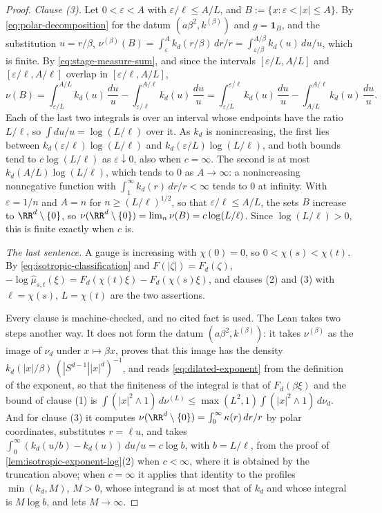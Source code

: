 \begin{proof}
\emph{Clause (3).} Let $0 < \varepsilon < A$ with $\varepsilon/\ell \le A/L$, and
$B := \{x : \varepsilon < |x| \le A\}$. By \ref{eq:polar-decomposition} for the datum
$(a\beta^2, k^{(\beta)})$ and $g = \mathbf 1_B$, and the substitution $u = r/\beta$,
$\nu^{(\beta)}(B) = \int_\varepsilon^A k_d(r/\beta)\,dr/r
= \int_{\varepsilon/\beta}^{A/\beta}k_d(u)\,du/u$, which is finite. By
\ref{eq:stage-measure-sum}, and since the intervals $[\varepsilon/L, A/L]$ and
$[\varepsilon/\ell, A/\ell]$ overlap in $[\varepsilon/\ell, A/L]$,
\[
  \nu(B) = \int_{\varepsilon/L}^{A/L}k_d(u)\,\frac{du}{u} - \int_{\varepsilon/\ell}^{A/\ell}k_d(u)\,\frac{du}{u}
         = \int_{\varepsilon/L}^{\varepsilon/\ell}k_d(u)\,\frac{du}{u}
           - \int_{A/L}^{A/\ell}k_d(u)\,\frac{du}{u} .
\]
Each of the last two integrals is over an interval whose endpoints have the ratio $L/\ell$, so
$\int du/u = \log(L/\ell)$ over it. As $k_d$ is nonincreasing, the first lies between
$k_d(\varepsilon/\ell)\log(L/\ell)$ and $k_d(\varepsilon/L)\log(L/\ell)$, and both bounds tend
to $c\log(L/\ell)$ as $\varepsilon \downarrow 0$, also when $c = \infty$. The second is at most
$k_d(A/L)\log(L/\ell)$, which tends to $0$ as $A \to \infty$: a nonincreasing nonnegative
function with $\int_1^\infty k_d(r)\,dr/r < \infty$ tends to $0$ at infinity. With
$\varepsilon = 1/n$ and $A = n$ for $n \ge (L/\ell)^{1/2}$, so that
$\varepsilon/\ell \le A/L$, the sets $B$ increase to $\RR^d \setminus \{0\}$, so
$\nu(\RR^d \setminus \{0\}) = \lim_n\nu(B) = c\log(L/\ell)$. Since $\log(L/\ell) > 0$, this is
finite exactly when $c$ is.

\emph{The last sentence.} A gauge is increasing with $\chi(0) = 0$, so
$0 < \chi(s) < \chi(t)$. By \ref{eq:isotropic-classification} and $F(|\zeta|) = F_d(\zeta)$,
$-\log\widehat\mu_{s,t}(\xi) = F_d(\chi(t)\xi) - F_d(\chi(s)\xi)$, and clauses (2) and (3) with
$\ell = \chi(s)$, $L = \chi(t)$ are the two assertions.

Every clause is machine-checked, and no cited fact is used. The Lean takes two steps another
way. It does not form the datum $(a\beta^2, k^{(\beta)})$: it takes $\nu^{(\beta)}$ as the image
of $\nu_d$ under $x \mapsto \beta x$, proves that this image has the density
$k_d(|x|/\beta)\,(|S^{d-1}||x|^d)^{-1}$, and reads \ref{eq:dilated-exponent} from the definition
of the exponent, so that the finiteness of the integral is that of $F_d(\beta\xi)$ and the bound
of clause (1) is
$\int(|x|^2 \wedge 1)\,d\nu^{(L)} \le \max(L^2,1)\int(|x|^2 \wedge 1)\,d\nu_d$. And for clause (3)
it computes $\nu(\RR^d \setminus \{0\}) = \int_0^\infty\kappa(r)\,dr/r$ by polar coordinates,
substitutes $r = \ell u$, and takes $\int_0^\infty(k_d(u/b) - k_d(u))\,du/u = c\log b$, with
$b = L/\ell$, from the proof of \ref{lem:isotropic-exponent-log}(2) when $c < \infty$, where it is
obtained by the truncation above; when $c = \infty$ it applies that identity to the profiles
$\min(k_d, M)$, $M > 0$, whose integrand is at most that of $k_d$ and whose integral is
$M\log b$, and lets $M \to \infty$.
\end{proof}

